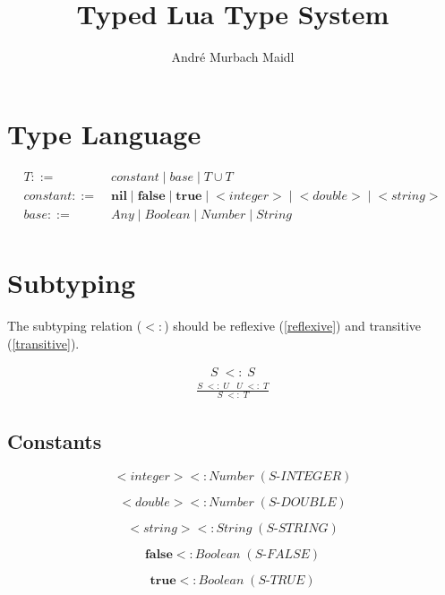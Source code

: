 \documentclass[12pt]{article}
\title{Typed Lua Type System}
\author{André Murbach Maidl}
\begin{document}
\maketitle

\section{Type Language}

\begin{align*}
T ::= \; & constant \; | \; base \; | \; T \cup T\\
constant ::= \; & \textbf{nil} \; | \; \textbf{false} \; | \; \textbf{true} \;
 | \; {<}integer{>} \; | \; {<}double{>} \; | \; {<}string{>}\\
base ::= \; & Any \; | \; Boolean \; | \; Number \; | \; String\\
\end{align*}

\section{Subtyping}

The subtyping relation ($<:$) should be reflexive (\ref{reflexive})
and transitive (\ref{transitive}).

\begin{align}
\label{reflexive}
S \; <: \; S
\end{align}
\begin{align}
\label{transitive}
\frac{S \; <: \; U \;\;\; U\;  <: \; T}{S \; <: \; T}
\end{align}

\subsection{Constants}

\[
{<}integer{>} <: Number \; (\textit{S-INTEGER})
\]

\[
{<}double{>} <: Number \; (\textit{S-DOUBLE})
\]

\[
{<}string{>} <: String \; (\textit{S-STRING})
\]

\[
\textbf{false} <: Boolean \; (\textit{S-FALSE})
\]

\[
\textbf{true} <: Boolean \; (\textit{S-TRUE})
\]

%
\end{document}
